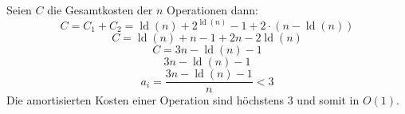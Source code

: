 \documentclass{article}
\begin{document}
Seien $C$ die Gesamtkosten der $n$ Operationen dann:
\begin{equation}
C=C_1+C_2={\operatorname{ld}(n)}+2^{\operatorname{ld}(n)}-1+2 \cdot ({n-\operatorname{ld}(n)})
\end{equation}
\begin{equation}
C={\operatorname{ld}(n)}+n-1+2 n-2{\operatorname{ld}(n)}
\end{equation}
\begin{equation}
C=3n-{\operatorname{ld}(n)}-1
\end{equation}
\begin{equation}
3n-{\operatorname{ld}(n)}-1
\end{equation}
\begin{equation}
a_i=\frac{3n-{\operatorname{ld}(n)}-1}{n} < 3
\end{equation}
Die amortisierten Kosten einer Operation sind höchstens $3$ und somit in $O(1)$.
\newpage
\end{document}
